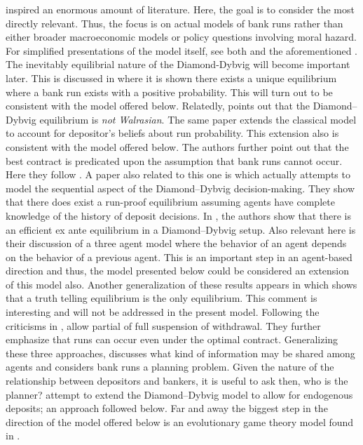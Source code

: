 \documentclass[12pt]{article}
\begin{document}
\begin{doublespace}
\citet{diamond1983bank} inspired an enormous amount of literature. Here, the goal is to consider the most directly relevant. Thus, the focus is on actual models of bank runs rather than either broader macroeconomic models or policy questions involving moral hazard. For simplified presentations of the model itself, see both \citet{diamond2007banks} and the aforementioned \citet{white1999theory}. The inevitably equilibrial nature of the Diamond-Dybvig will become important later. This is discussed in \citet{postlewaite1987bank} where it is shown there exists a unique equilibrium where a bank run exists with a positive probability. This will turn out to be consistent with the model offered below. Relatedly, \citet{shelldiamond} points out that the Diamond--Dybvig equilibrium is \emph{not Walrasian}. The same paper extends the classical model to account for depositor's beliefs about run probability. This extension also is consistent with the model offered below. The authors further point out that the best contract is predicated upon the assumption that bank runs cannot occur. Here they follow \citet{ennis2010fundamental}. A paper also related to this one is \citet{kinateder2014sequential} which actually attempts to model the sequential aspect of the Diamond--Dybvig decision-making. They show that there does exist a run-proof equilibrium assuming agents have complete knowledge of the history of deposit decisions. In \citet{green2000diamond}, the authors show that there is an efficient ex ante equilibrium in a Diamond--Dybvig setup. Also relevant here is their discussion of a three agent model where the behavior of an agent depends on the behavior of a previous agent. This is an important step in an agent-based direction and thus, the model presented below could be considered an extension of this model also. Another generalization of these results appears in \citet{andolfatto2007role} which shows that a truth telling equilibrium is the only equilibrium. This comment is interesting and will not be addressed in the present model. Following the criticisms in \citet{white1999theory}, \citet{peck2003equilibrium} allow partial of full suspension of withdrawal. They further emphasize that runs can occur even under the optimal contract. Generalizing these three approaches, \citet{nosal2009information} discusses what kind of information may be shared among agents and considers bank runs a planning problem. Given the nature of the relationship between depositors and bankers, it is useful to ask then, who is the planner? \citet{peck2019diamond} attempt to extend the Diamond--Dybvig model to allow for endogenous deposits; an approach followed below. Far and away the biggest step in the direction of the model offered below is an evolutionary game theory model found in \citet{smith2014runs}.


\end{doublespace}
\end{document}
